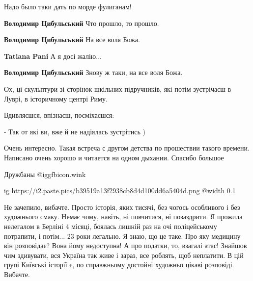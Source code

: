  
 
 
 
 
\zzSecCmt

\begin{itemize} %
Надо было таки дать по морде фулиганам!

\begin{itemize} %
\textbf{Володимир Цибульський} Что прошло, то прошло.

\textbf{Володимир Цибульський} На все воля Божа.

\textbf{Tatiana Pani} А я досі жалію...

\textbf{Володимир Цибульський} Знову ж таки, на все воля Божа.
\end{itemize} %


Ох, ці скульптури зі сторінок шкільних підручників, які потім зустрічаєш в Луврі, в історичному центрі Риму.

Вдивляєшся, впізнаєш, посміхаєшся:

- Так от які ви, вже й не надіялась зустрітись )


Очень интересно. Такая встреча с другом детства по прошествии такого
времени. Написано очень хорошо и читается на одном дыхании. Спасибо большое


Дружбаны @igg{fbicon.wink} 

\ifcmt
  ig https://i2.paste.pics/b39519a13f2938cb8d4d100dd6a5404d.png
  @width 0.1
\fi


Не зачепило, вибачте. Просто історія, яких тисячі, без чогось особливого і без
художнього смаку. Немає чому, навіть, ні повчитися, ні позаздрити. Я прожила
нелегалом в Берліні 4 місяці, боялась лишній раз на очі поліцейському
потрапити, і потім... 23 роки легально. Я знаю, що це таке. Про яку медицину
він розповідає? Вона йому недоступна! А про податки, то, взагалі атас! Знайшов
чим здивувати, вся Україна так живе і зараз, все роблять, щоб неплатити. В цій
групі Київські історії є, по справжньому достойні художньо цікаві розповіді.
Вибачте.


\end{itemize}
